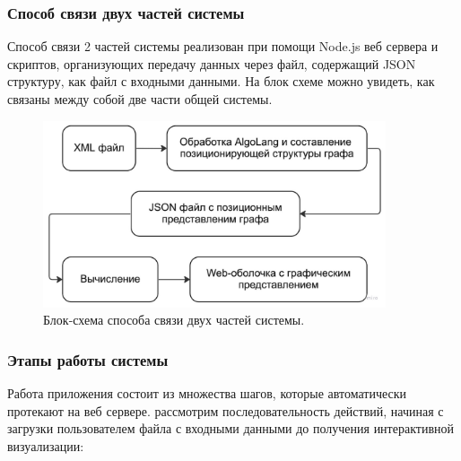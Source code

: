 \subsubsection{Способ связи двух частей системы}

Способ связи 2 частей системы реализован при помощи Node.js веб сервера и скриптов, организующих передачу данных через файл, содержащий JSON структуру, как файл с входными данными. На блок схеме можно увидеть, как связаны между собой две части общей системы. 

\begin{figure}[!ht]
    \centering
    \includegraphics[width=0.9\textwidth]{assets/connection_1.jpg}
    \caption{Блок-схема способа связи двух частей системы.}
    \label{fig:connection}
\end{figure}


\subsubsection{Этапы работы системы}

Работа приложения состоит из множества шагов, которые автоматически протекают на веб сервере. рассмотрим последовательность действий, начиная с загрузки пользователем файла с входными данными до получения интерактивной визуализации:

